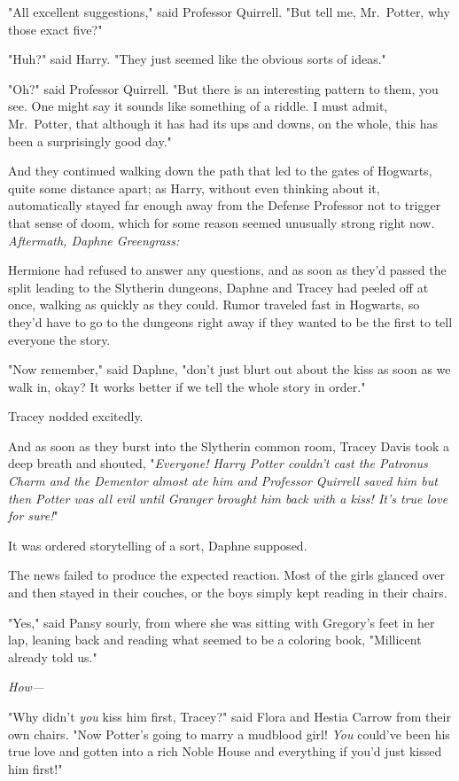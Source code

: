 "All excellent suggestions," said Professor Quirrell. "But tell me, Mr.~Potter, 
why those exact five?"

"Huh?" said Harry. "They just seemed like the obvious sorts of ideas."

"Oh?" said Professor Quirrell. "But there is an interesting pattern to them, 
you see. One might say it sounds like something of a riddle. I must admit, 
Mr.~Potter, that although it has had its ups and downs, on the whole, this has 
been a surprisingly good day."

And they continued walking down the path that led to the gates of Hogwarts, 
quite some distance apart; as Harry, without even thinking about it, 
automatically stayed far enough away from the Defense Professor not to trigger 
that sense of doom, which for some reason seemed unusually strong right now.
\sbreak
\emph{Aftermath, Daphne Greengrass:}

Hermione had refused to answer any questions, and as soon as they'd passed the 
split leading to the Slytherin dungeons, Daphne and Tracey had peeled off at 
once, walking as quickly as they could. Rumor traveled fast in Hogwarts, so 
they'd have to go to the dungeons right away if they wanted to be the first to 
tell everyone the story.

"Now remember," said Daphne, "don't just blurt out about the kiss as soon as we 
walk in, okay? It works better if we tell the whole story in order."

Tracey nodded excitedly.

And as soon as they burst into the Slytherin common room, Tracey Davis took a 
deep breath and shouted, "\emph{Everyone! Harry Potter couldn't cast the 
Patronus Charm and the Dementor almost ate him and Professor Quirrell saved him 
but then Potter was all evil until Granger brought him back with a kiss! It's 
true love for sure!}"

It was ordered storytelling of a sort, Daphne supposed.

The news failed to produce the expected reaction. Most of the girls glanced 
over and then stayed in their couches, or the boys simply kept reading in their 
chairs.

"Yes," said Pansy sourly, from where she was sitting with Gregory's feet in her 
lap, leaning back and reading what seemed to be a coloring book, "Millicent 
already told us."

\emph{How---}

"Why didn't \emph{you} kiss him first, Tracey?" said Flora and Hestia Carrow 
from their own chairs. "Now Potter's going to marry a mudblood girl! \emph{You} 
could've been his true love and gotten into a rich Noble House and everything 
if you'd just kissed him first!"

